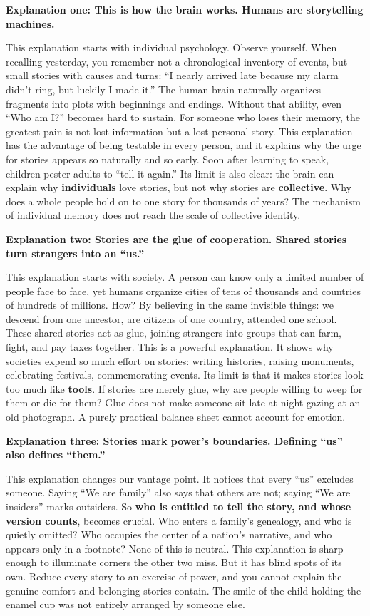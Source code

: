 \textbf{Explanation one: This is how the brain works. Humans are storytelling machines.}

This explanation starts with individual psychology. Observe yourself. When recalling yesterday, you remember not a chronological inventory of events, but small stories with causes and turns: ``I nearly arrived late because my alarm didn't ring, but luckily I made it.'' The human brain naturally organizes fragments into plots with beginnings and endings. Without that ability, even ``Who am I?'' becomes hard to sustain. For someone who loses their memory, the greatest pain is not lost information but a lost personal story. This explanation has the advantage of being testable in every person, and it explains why the urge for stories appears so naturally and so early. Soon after learning to speak, children pester adults to ``tell it again.'' Its limit is also clear: the brain can explain why \textbf{individuals} love stories, but not why stories are \textbf{collective}. Why does a whole people hold on to one story for thousands of years? The mechanism of individual memory does not reach the scale of collective identity.

\textbf{Explanation two: Stories are the glue of cooperation. Shared stories turn strangers into an ``us.''}

This explanation starts with society. A person can know only a limited number of people face to face, yet humans organize cities of tens of thousands and countries of hundreds of millions. How? By believing in the same invisible things: we descend from one ancestor, are citizens of one country, attended one school. These shared stories act as glue, joining strangers into groups that can farm, fight, and pay taxes together. This is a powerful explanation. It shows why societies expend so much effort on stories: writing histories, raising monuments, celebrating festivals, commemorating events. Its limit is that it makes stories look too much like \textbf{tools}. If stories are merely glue, why are people willing to weep for them or die for them? Glue does not make someone sit late at night gazing at an old photograph. A purely practical balance sheet cannot account for emotion.

\textbf{Explanation three: Stories mark power's boundaries. Defining ``us'' also defines ``them.''}

This explanation changes our vantage point. It notices that every ``us'' excludes someone. Saying ``We are family'' also says that others are not; saying ``We are insiders'' marks outsiders. So \textbf{who is entitled to tell the story, and whose version counts}, becomes crucial. Who enters a family's genealogy, and who is quietly omitted? Who occupies the center of a nation's narrative, and who appears only in a footnote? None of this is neutral. This explanation is sharp enough to illuminate corners the other two miss. But it has blind spots of its own. Reduce every story to an exercise of power, and you cannot explain the genuine comfort and belonging stories contain. The smile of the child holding the enamel cup was not entirely arranged by someone else.

